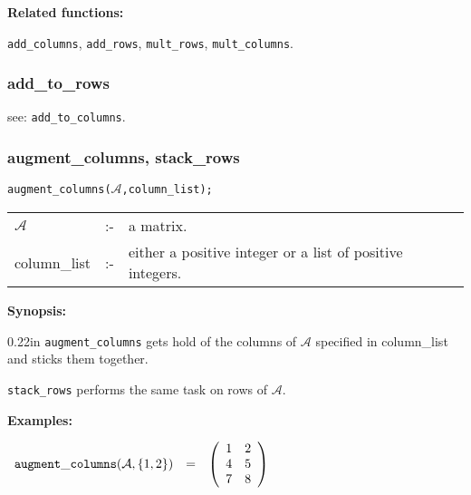 {\bf Related functions:}

\hspace*{0.175in} 
{\tt add\_columns}, {\tt add\_rows}, {\tt mult\_rows}, 
{\tt mult\_columns}.


\subsubsection{add\_to\_rows}
\label{linalg:add_to_rows}

\hspace*{0.175in} see: {\tt add\_to\_columns}.


\subsubsection{augment\_columns, stack\_rows}
\label{linalg:augment_columns}

\hspace*{0.175in} {\tt augment\_columns($\mathcal{A}$,column\_list);}

\hspace*{0.1in}
\begin{tabular}{l l l}
$\mathcal{A}$  &:-& a matrix. \\
column\_list &:-&  either a positive integer or a list of positive 
                   integers. 
\end{tabular}

{\bf Synopsis:} %

\begin{addtolength}{\leftskip}{0.22in}
{\tt augment\_columns} gets hold of the columns of $\mathcal{A}$ specified 
in column\_list and sticks them together. 

{\tt stack\_rows} performs the same task on rows of 
                $\mathcal{A}$.

\end{addtolength}

{\bf Examples:}

\begin{flushleft}  
\hspace*{0.1in}
\begin{math}
\begin{array}{ccc}
{\tt augment\_columns}(\mathcal{A},\{1,2\}) & = & 
\left( \begin{array}{cc} 1 & 2 \\ 4 & 5 \\ 7 & 8  
\end{array} \right)  
\end{array}
\end{math}  
\end{flushleft}

